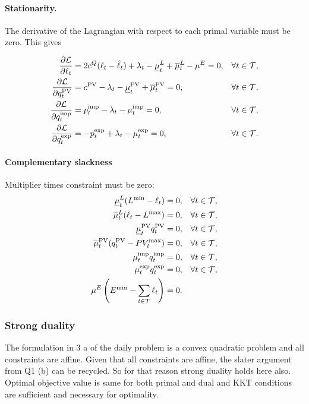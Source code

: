 \paragraph{Stationarity.}
The derivative of the Lagrangian with respect to each primal variable must be zero. This gives

\begin{align}
    \frac{\partial \mathcal{L}}{\partial \ell_{t}}
    &= 2c^Q(\ell_{t}-\hat{\ell}_{t})+\lambda_{t}-\underline{\mu}^{L}_{t}+\overline{\mu}^{L}_{t}-\mu^{E} = 0,
    && \forall t\in\mathcal{T},
    \label{eq:q3_stationarity_load}\\
    \frac{\partial \mathcal{L}}{\partial q^{\mathrm{PV}}_{t}}
    &= c^{\mathrm{PV}}-\lambda_{t}-\underline{\mu}^{\mathrm{PV}}_{t}+\overline{\mu}^{\mathrm{PV}}_{t} = 0,
    && \forall t\in\mathcal{T}, \nonumber\\
    \frac{\partial \mathcal{L}}{\partial q^{\mathrm{imp}}_{t}}
    &= p^{\mathrm{imp}}_{t}-\lambda_{t}-\mu^{\mathrm{imp}}_{t} = 0,
    && \forall t\in\mathcal{T}, \nonumber\\
    \frac{\partial \mathcal{L}}{\partial q^{\mathrm{exp}}_{t}}
    &= -p^{\mathrm{exp}}_{t}+\lambda_{t}-\mu^{\mathrm{exp}}_{t} = 0,
    && \forall t\in\mathcal{T}. \nonumber
\end{align}

\paragraph{Complementary slackness} Multiplier times constraint must be zero:
\begin{align}
    \underline{\mu}^{L}_{t}(L^{\min}-\ell_{t}) &= 0,
    && \forall t\in\mathcal{T}, \nonumber\\
    \overline{\mu}^{L}_{t}(\ell_{t}-L^{\max}) &= 0,
    && \forall t\in\mathcal{T}, \nonumber\\
    \underline{\mu}^{\mathrm{PV}}_{t}q^{\mathrm{PV}}_{t} &= 0,
    && \forall t\in\mathcal{T}, \nonumber\\
    \overline{\mu}^{\mathrm{PV}}_{t}(q^{\mathrm{PV}}_{t}-PV_{t}^{\max}) &= 0,
    && \forall t\in\mathcal{T}, \nonumber\\
    \mu^{\mathrm{imp}}_{t}q^{\mathrm{imp}}_{t} &= 0,
    && \forall t\in\mathcal{T}, \nonumber\\
    \mu^{\mathrm{exp}}_{t}q^{\mathrm{exp}}_{t} &= 0,
    && \forall t\in\mathcal{T}, \nonumber\\
    \mu^{E}\left(E^{\min}-\sum_{t\in\mathcal{T}}\ell_{t}\right) &= 0.
    \label{eq:q3_complementary}
\end{align}

\subsubsection{Strong duality}

The formulation in 3 a of the daily problem is a convex quadratic problem and all constraints are affine. Given that all constraints are affine, the slater argument from Q1 (b) can be recycled. So for that reason strong duality holds here also. Optimal objective value is same for both primal and dual and KKT conditions are sufficient and necessary for optimality.

